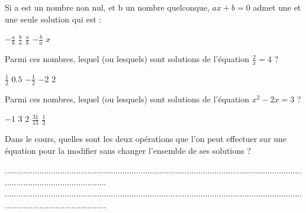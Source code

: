 \documentclass[10pt,a4paper]{exam}
\begin{document}
Si a est un nombre non nul, et b un nombre quelconque, $ax+b=0$  admet une et une seule solution qui est :\newline
\begin{oneparcheckboxes}
   \choice $-\frac{a}{b}$
   \choice $\frac{b}{a}$
   \choice $\frac{a}{b}$
   \choice $-\frac{b}{a}$
   \choice $x$
\end{oneparcheckboxes}
 
Parmi ces nombres, lequel (ou lesquels) sont solutions de l'équation   $\frac{2}{x}=4$ ?\newline
\begin{oneparcheckboxes}
   \choice $\frac{1}{2}$
   \choice $0.5$
   \choice $-\frac{1}{2}$
   \choice $-2$
   \choice $2$
\end{oneparcheckboxes}
 
Parmi ces nombres, lequel (ou lesquels) sont solutions de l'équation   $x^2 - 2x = 3$ ?\newline
\begin{oneparcheckboxes}
   \choice $-1$
   \choice $3$
   \choice $2$
   \choice $\frac{31}{13}$
   \choice $\frac{1}{2}$
\end{oneparcheckboxes}
 
Dans le cours, quelles sont les deux opérations que l'on peut effectuer sur une équation pour la modifier sans changer l'ensemble de ses solutions ?

.............................................................................................................................................................................\newline
.............................................................................................................................................................................
 
 
\end{document}
